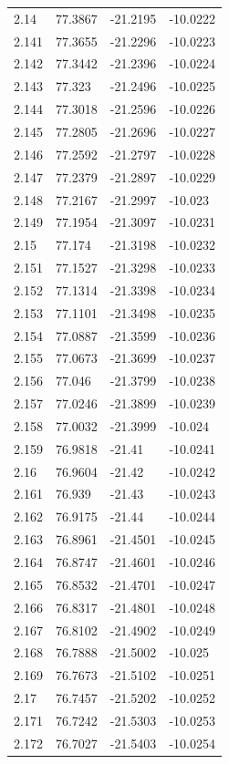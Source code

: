 \begin{tabular}{llll}
2.14 & 77.3867 & -21.2195 & -10.0222 \\
2.141 & 77.3655 & -21.2296 & -10.0223 \\
2.142 & 77.3442 & -21.2396 & -10.0224 \\
2.143 & 77.323 & -21.2496 & -10.0225 \\
2.144 & 77.3018 & -21.2596 & -10.0226 \\
2.145 & 77.2805 & -21.2696 & -10.0227 \\
2.146 & 77.2592 & -21.2797 & -10.0228 \\
2.147 & 77.2379 & -21.2897 & -10.0229 \\
2.148 & 77.2167 & -21.2997 & -10.023 \\
2.149 & 77.1954 & -21.3097 & -10.0231 \\
2.15 & 77.174 & -21.3198 & -10.0232 \\
2.151 & 77.1527 & -21.3298 & -10.0233 \\
2.152 & 77.1314 & -21.3398 & -10.0234 \\
2.153 & 77.1101 & -21.3498 & -10.0235 \\
2.154 & 77.0887 & -21.3599 & -10.0236 \\
2.155 & 77.0673 & -21.3699 & -10.0237 \\
2.156 & 77.046 & -21.3799 & -10.0238 \\
2.157 & 77.0246 & -21.3899 & -10.0239 \\
2.158 & 77.0032 & -21.3999 & -10.024 \\
2.159 & 76.9818 & -21.41 & -10.0241 \\
2.16 & 76.9604 & -21.42 & -10.0242 \\
2.161 & 76.939 & -21.43 & -10.0243 \\
2.162 & 76.9175 & -21.44 & -10.0244 \\
2.163 & 76.8961 & -21.4501 & -10.0245 \\
2.164 & 76.8747 & -21.4601 & -10.0246 \\
2.165 & 76.8532 & -21.4701 & -10.0247 \\
2.166 & 76.8317 & -21.4801 & -10.0248 \\
2.167 & 76.8102 & -21.4902 & -10.0249 \\
2.168 & 76.7888 & -21.5002 & -10.025 \\
2.169 & 76.7673 & -21.5102 & -10.0251 \\
2.17 & 76.7457 & -21.5202 & -10.0252 \\
2.171 & 76.7242 & -21.5303 & -10.0253 \\
2.172 & 76.7027 & -21.5403 & -10.0254 \\

\end{tabular}
